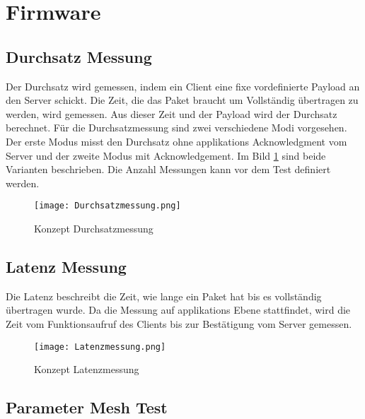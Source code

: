 	\clearpage
\section{Firmware}\label{sec:Firmware}


\newpage


\subsection{Durchsatz Messung}\label{subsec:DurchsatzMessung}
Der Durchsatz wird gemessen, indem ein Client eine fixe vordefinierte Payload an den Server schickt. Die Zeit, die das Paket braucht um Vollständig übertragen zu werden, wird gemessen. Aus dieser Zeit und der Payload wird der Durchsatz berechnet. Für die Durchsatzmessung sind zwei verschiedene Modi vorgesehen. Der erste Modus misst den Durchsatz ohne applikations Acknowledgment vom Server und der zweite Modus mit Acknowledgement. Im Bild \ref{fig:KonzeptDurchsatzmessung} sind beide Varianten beschrieben. Die Anzahl Messungen kann vor dem Test definiert werden. 

\begin{figure}[H]
	\centering
	\texttt{[image: Durchsatzmessung.png]}
	\caption{Konzept Durchsatzmessung}\label{fig:KonzeptDurchsatzmessung}
\end{figure}

\subsection{Latenz Messung}\label{subsec:LatenzMessung}
Die Latenz beschreibt die Zeit, wie lange ein Paket hat bis es vollständig übertragen wurde. Da die Messung auf applikations Ebene stattfindet, wird die Zeit vom Funktionsaufruf des Clients bis zur Bestätigung vom Server gemessen. 

\begin{figure}[H]
	\centering
	\texttt{[image: Latenzmessung.png]}
	\caption{Konzept Latenzmessung}\label{fig:Konzept Latenzmessung}
\end{figure}
\newpage





\subsection{Parameter Mesh Test}\label{subsec:ParameterMeshTest}



